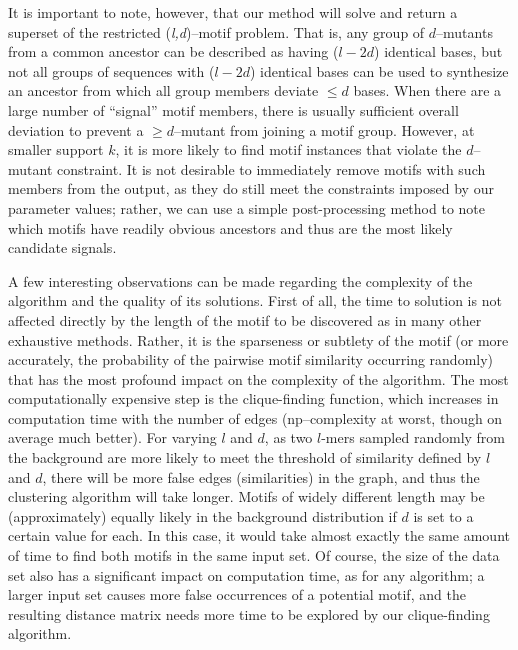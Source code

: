    It is important to note, however,
    that our method will solve and return a superset of the restricted
    (\textit{l,d})--motif problem.  That is, any group of $d$--mutants from a
    common ancestor can be described as having ($l-2d$) identical bases, but
    not all groups of sequences with ($l-2d$) identical bases can be used to
    synthesize an ancestor from which all group members deviate $\leq d$ bases.
    When there are a large number of ``signal'' motif members, there
    is usually sufficient overall deviation to prevent a $\geq d$--mutant from
    joining a motif group.  However, at smaller support $k$, it is more likely
    to find motif instances that violate the $d$--mutant constraint.  It is not
    desirable to immediately remove motifs with such members from the output, as they
    do still meet the constraints imposed by our parameter values; rather, we
    can use a simple post-processing method to note which motifs have readily
    obvious ancestors and thus are the most likely candidate signals.

    A few interesting observations can be made regarding the complexity of
    the algorithm and the quality of its solutions.  First
    of all, the time to solution is not affected directly by the
    length of the motif to be discovered as in many other exhaustive methods.
    Rather, it is the sparseness or subtlety of the
    motif (or more accurately, the probability of the pairwise motif similarity occurring
    randomly) that has the most profound impact on the complexity of the
    algorithm.  The most computationally expensive step is the clique-finding
    function, which
    increases in computation time with the number of edges (np--complexity at worst,
    though on average much better).
    For varying $l$ and $d$, as two $l$-mers sampled randomly from
    the background are more likely to meet the threshold of similarity defined by
    $l$ and $d$, there will be more false edges (similarities) in the graph,
    and thus the clustering algorithm will take longer.  Motifs of widely different
    length may be (approximately) equally likely in the background
    distribution if $d$ is set to a certain value for each.  In this case, it
    would take almost exactly the same amount of time to find both motifs in
    the same input set.  Of course, the size of the data set also has a
    significant impact on computation time, as for
    any algorithm; a larger input set
    causes more false occurrences of a potential motif,
    and the resulting distance matrix needs
    more time to be explored by our clique-finding algorithm.

